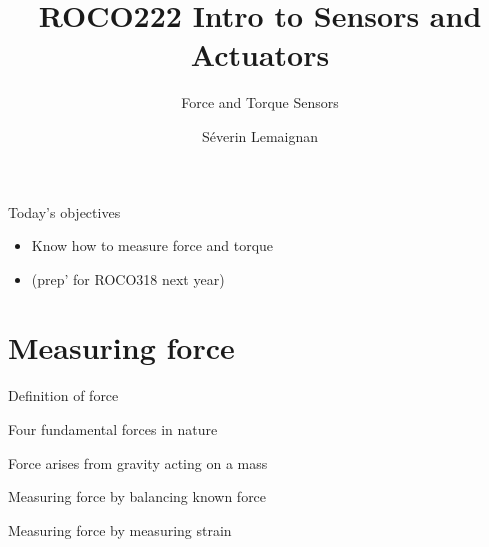 \documentclass[compress]{beamer}
\title{ROCO222 \newline Intro to Sensors and Actuators}
\subtitle{Force and Torque Sensors}
\date{}
\author{Séverin Lemaignan}
\institute{Centre for Neural Systems and Robotics\\{\bf Plymouth University}}
\makeatletter
\let\beamer@writeslidentry@miniframeson=\beamer@writeslidentry
\def\beamer@writeslidentry@miniframesoff{%
  \expandafter\beamer@ifempty\expandafter{\beamer@framestartpage}{}%
  {%
    \clearpage\beamer@notesactions%
  }
}
\newcommand*{\miniframeson}{\let\beamer@writeslidentry=\beamer@writeslidentry@miniframeson}
\newcommand*{\miniframesoff}{\let\beamer@writeslidentry=\beamer@writeslidentry@miniframesoff}
\makeatother
\begin{document}

\maketitle

\miniframesoff

\begin{frame}{Today's objectives}

    \begin{itemize}
            \item Know how to measure force and torque
            \item (prep' for ROCO318 next year)
    \end{itemize}
\end{frame}

\miniframeson


\section[Magnets]{Measuring force}

{
\begin{frame}{Definition of force}

\pnote{
}
\end{frame}
}
{
\begin{frame}{Four fundamental forces in nature}

\pnote{
}
\end{frame}
}

{
\begin{frame}{Force arises from gravity acting on a mass}

\pnote{
}
\end{frame}
}

{
\begin{frame}{Measuring force by balancing known force}

\pnote{
}
\end{frame}
}

{
\begin{frame}{Measuring force by measuring strain}

\pnote{
}
\end{frame}
}
\end{document}
